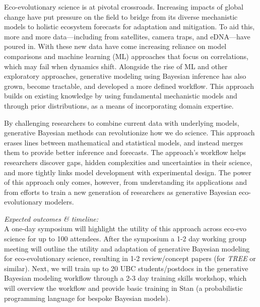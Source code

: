 \documentclass[11pt,letter]{article}
\begin{document}
\thispagestyle{empty}
\renewcommand{\thefootnote}{\fnsymbol{footnote}}
\begin{center}
\end{center}

Eco-evolutionary science is at pivotal crossroads. Increasing impacts of global change have put pressure on the field to bridge from its diverse mechanistic models to holistic ecosystem forecasts for adaptation and mitigation. To aid this, more and more data---including from satellites, camera traps, and eDNA---have poured in. With these new data have come increasing reliance on model comparisons and machine learning (ML) approaches that focus on correlations, which may fail when dynamics shift. Alongside the rise of ML and other exploratory approaches, generative modeling using Bayesian inference has also grown, become tractable, and developed a more defined workflow. This approach builds on existing knowledge by using fundamental mechanistic models and through prior distributions, as a means of incorporating domain expertise. %

By challenging researchers to combine current data with underlying models, generative Bayesian methods can revolutionize how we do science. This approach erases lines between mathematical and statistical models, and instead merges them to provide better inference and forecasts. The approach's workflow helps researchers discover gaps, hidden complexities and uncertainties in their science, and more tightly links model development with experimental design. The power of this approach only comes, however, from understanding its applications and from efforts to train a new generation of researchers as generative Bayesian eco-evolutionary modelers.  

\emph{Expected outcomes \& timeline:} \\
A one-day symposium will highlight the utility of this approach across eco-evo science for up to 100 attendees. After the symposium a 1-2 day working group meeting will outline the utility and adaptation of generative Bayesian modeling for eco-evolutionary science, resulting in 1-2 review/concept papers (for \emph{TREE} or similar). Next, we will train up to 20 UBC students/postdocs in the generative Bayesian modeling workflow through a 2-3 day training skills workshop, which will overview the workflow and provide basic training in Stan (a probabilistic programming language for bespoke Bayesian models). 
\end{document}
